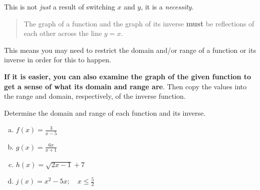This is not \emph{just} a result of switching $x$ and $y$, it is a \emph{necessity}.

\begin{quote}
    The graph of a function and the graph of its inverse \textbf{must} be reflections of each other across the line $y = x$.
\end{quote}

This means you may need to restrict the domain and/or range of a function or its inverse in order for this to happen. \newline 

{\color{blue}\textbf{If it is easier, you can also examine the graph of the given function to get a sense of what its domain and range are}}. Then copy the values into the range and domain, respectively, of the inverse function. \newline 

\begin{example}
Determine the domain and range of each function and its inverse.
\begin{multicols}{4}
    \begin{enumerate}[(a)]
        \item $f(x) = \tfrac{3}{x-5}$    
        \item $g(x) = \tfrac{6x}{x+1}$   
        \item $h(x) = \sqrt{2x-1}+7$
        \item $j(x) = x^2 - 5x; \quad x \leq \frac{5}{2}$   \label{2d}
    \end{enumerate}
\end{multicols}
\end{example}

